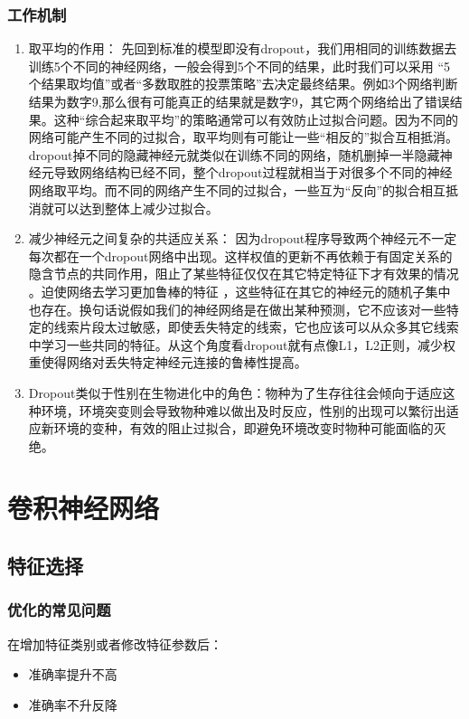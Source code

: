 \documentclass[UTF8]{ctexart}
\begin{document}
\subsubsection{工作机制}
\begin{enumerate}
	\item 取平均的作用： 先回到标准的模型即没有dropout，我们用相同的训练数据去训练5个不同的神经网络，一般会得到5个不同的结果，此时我们可以采用 “5个结果取均值”或者“多数取胜的投票策略”去决定最终结果。例如3个网络判断结果为数字9,那么很有可能真正的结果就是数字9，其它两个网络给出了错误结果。这种“综合起来取平均”的策略通常可以有效防止过拟合问题。因为不同的网络可能产生不同的过拟合，取平均则有可能让一些“相反的”拟合互相抵消。dropout掉不同的隐藏神经元就类似在训练不同的网络，随机删掉一半隐藏神经元导致网络结构已经不同，整个dropout过程就相当于对很多个不同的神经网络取平均。而不同的网络产生不同的过拟合，一些互为“反向”的拟合相互抵消就可以达到整体上减少过拟合。
	\item 减少神经元之间复杂的共适应关系： 因为dropout程序导致两个神经元不一定每次都在一个dropout网络中出现。这样权值的更新不再依赖于有固定关系的隐含节点的共同作用，阻止了某些特征仅仅在其它特定特征下才有效果的情况 。迫使网络去学习更加鲁棒的特征 ，这些特征在其它的神经元的随机子集中也存在。换句话说假如我们的神经网络是在做出某种预测，它不应该对一些特定的线索片段太过敏感，即使丢失特定的线索，它也应该可以从众多其它线索中学习一些共同的特征。从这个角度看dropout就有点像L1，L2正则，减少权重使得网络对丢失特定神经元连接的鲁棒性提高。
	\item Dropout类似于性别在生物进化中的角色：物种为了生存往往会倾向于适应这种环境，环境突变则会导致物种难以做出及时反应，性别的出现可以繁衍出适应新环境的变种，有效的阻止过拟合，即避免环境改变时物种可能面临的灭绝。
\end{enumerate}



\newpage
\section{卷积神经网络}
\subsection{特征选择}
\subsubsection{优化的常见问题}
在增加特征类别或者修改特征参数后：
\begin{itemize}
	\item 准确率提升不高
	\item 准确率不升反降
\end{itemize}
\end{document}
